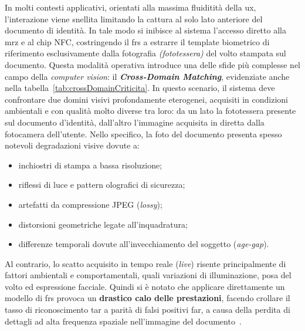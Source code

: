 In molti contesti applicativi, orientati alla massima fluiditità della \gls{ux}, l'interazione viene snellita limitando la cattura al solo lato anteriore del documento di identità. In tale modo si inibisce al sistema l'accesso diretto alla \gls{mrz} e al chip NFC, costringendo il \gls{frs} a estrarre il template biometrico di riferimento esclusivamente dalla fotografia \textit{(fototessera)} del volto stampata sul documento. 
Questa modalità operativa introduce una delle sfide più complesse nel campo della \textit{computer vision}: il \textbf{\textit{Cross-Domain Matching}}, evidenziate anche nella tabella~\ref{tab:crossDomainCriticita}. 
In questo scenario, il sistema deve confrontare due domini visivi profondamente eterogenei, acquisiti in condizioni ambientali e con qualità molto diverse tra loro: da un lato la fototessera presente sul documento d'identità, dall'altro l'immagine acquisita in diretta dalla fotocamera dell'utente.
Nello specifico, la foto del documento presenta spesso notevoli degradazioni visive dovute a:
\begin{itemize}
    \item inchiostri di stampa a bassa risoluzione;
    \item riflessi di luce e pattern olografici di sicurezza;
    \item artefatti da compressione JPEG (\textit{lossy});
    \item distorsioni geometriche legate all'inquadratura;
    \item differenze temporali dovute all'invecchiamento del soggetto (\textit{age-gap}).
\end{itemize}
Al contrario, lo scatto acquisito in tempo reale (\textit{live}) risente principalmente di fattori ambientali e comportamentali, quali variazioni di illuminazione, posa del volto ed espressione facciale.
Quindi si è notato che applicare direttamente un modello di \gls{frs} provoca un \textbf{drastico calo delle prestazioni}, facendo crollare il tasso di riconoscimento \gls{tar} a parità di falsi positivi \gls{far}, a causa della perdita di dettagli ad alta frequenza spaziale nell'immagine del documento~\cite{shiDocFaceMatchingID2018}.

